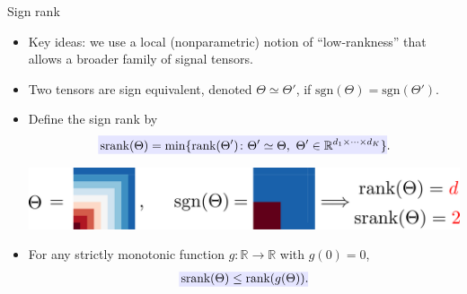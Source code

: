 \documentclass[10pt, mathserif]{beamer} %
\theoremstyle{definition}
\theoremstyle{plain}
\begin{document}
\begin{frame}{Sign rank}
\begin{itemize}
    \item Key ideas: we use {\color{red}a local (nonparametric) notion of ``low-rankness''} that allows a broader family of signal tensors. 
        
    \item  Two tensors are sign equivalent, denoted $\Theta \simeq \Theta'$, if $\text{sgn}(\Theta) = \text{sgn}(\Theta')$.

    \item Define the {\color{red}sign rank} by
  \begin{align}
    \rlap{\textcolor{blue!10}{\rule[-\dp\strutbox]{235pt}{\baselineskip}}}\,\text{srank}(\Theta) = \min\{\text{rank}(\Theta')\colon \Theta'\simeq \Theta, \ \Theta'\in\mathbb{R}^{d_1\times\cdots\times d_K}\}.
\end{align}
    
 \begin{center}
    \includegraphics[width =.9\textwidth]{Figures/signrank_new.pdf}
    \end{center}
\item For any strictly monotonic function $g\colon\mathbb{R}\rightarrow \mathbb{R}$ with $g(0) = 0$,
\[\rlap{\textcolor{blue!10}{\rule[-\dp\strutbox]{105pt}{\baselineskip}}}\,\text{srank}(\Theta)\leq \text{rank}(g(\Theta)).\]
\end{itemize}
\end{frame}
\end{document}
